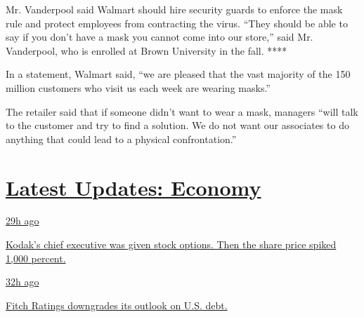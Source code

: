 Mr. Vanderpool said Walmart should hire security guards to enforce the
mask rule and protect employees from contracting the virus. ``They
should be able to say if you don't have a mask you cannot come into our
store,'' said Mr. Vanderpool, who is enrolled at Brown University in the
fall. ****

In a statement, Walmart said, ``we are pleased that the vast majority of
the 150 million customers who visit us each week are wearing masks.''

The retailer said that if someone didn't want to wear a mask, managers
``will talk to the customer and try to find a solution. We do not want
our associates to do anything that could lead to a physical
confrontation.''

\hypertarget{latest-updates-economy}{%
\section{\texorpdfstring{\href{https://www.nytimes.com/live/2020/07/31/business/stock-market-today-coronavirus?action=click\&pgtype=Article\&state=default\&region=MAIN_CONTENT_1\&context=storylines_live_updates}{Latest
Updates:
Economy}}{Latest Updates: Economy}}\label{latest-updates-economy}}

\href{https://www.nytimes.com/live/2020/07/31/business/stock-market-today-coronavirus?action=click\&pgtype=Article\&state=default\&region=MAIN_CONTENT_1\&context=storylines_live_updates\#kodaks-chief-executive-was-given-stock-options-then-the-share-price-spiked-1000-percent}{29h
ago}

\href{https://www.nytimes.com/live/2020/07/31/business/stock-market-today-coronavirus?action=click\&pgtype=Article\&state=default\&region=MAIN_CONTENT_1\&context=storylines_live_updates\#kodaks-chief-executive-was-given-stock-options-then-the-share-price-spiked-1000-percent}{Kodak's
chief executive was given stock options. Then the share price spiked
1,000 percent.}

\href{https://www.nytimes.com/live/2020/07/31/business/stock-market-today-coronavirus?action=click\&pgtype=Article\&state=default\&region=MAIN_CONTENT_1\&context=storylines_live_updates\#fitch-ratings-downgrades-its-outlook-on-us-debt}{32h
ago}

\href{https://www.nytimes.com/live/2020/07/31/business/stock-market-today-coronavirus?action=click\&pgtype=Article\&state=default\&region=MAIN_CONTENT_1\&context=storylines_live_updates\#fitch-ratings-downgrades-its-outlook-on-us-debt}{Fitch
Ratings downgrades its outlook on U.S. debt.}

